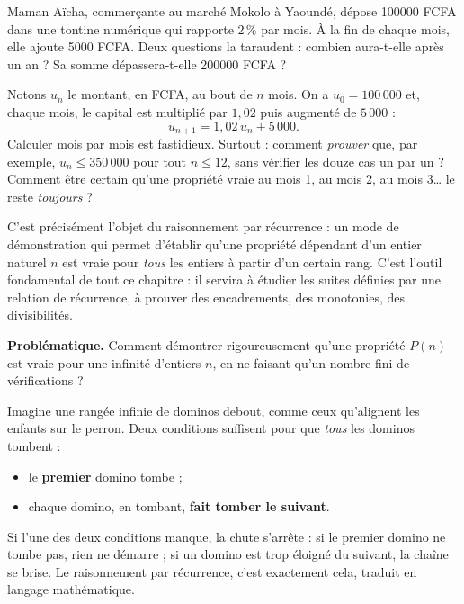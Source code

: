 \documentclass[11pt]{article}
\newcommand{\cle}[1]{{\popxbold\color{popdark}#1}}
\newcounter{popsec}
\newcounter{popsub}
\newcommand{\courssub}[1]{%
  \stepcounter{popsub}%
  \par\vspace{9pt}\noindent{\popxbold\fontsize{11.5}{13}\selectfont\color{popink}{\color{poporange}\thepopsec.\thepopsub}\hspace{6pt}#1}\par\nopagebreak\vspace{4pt}
}
\begin{document}
Maman Aïcha, commerçante au marché Mokolo à Yaoundé, dépose \SI{100000}{} FCFA dans une tontine numérique qui rapporte $2\,\%$ par mois. À la fin de chaque mois, elle ajoute \SI{5000}{} FCFA. Deux questions la taraudent : combien aura-t-elle après un an ? Sa somme dépassera-t-elle \SI{200000}{} FCFA ?

Notons $u_n$ le montant, en FCFA, au bout de $n$ mois. On a $u_0 = 100\,000$ et, chaque mois, le capital est multiplié par $1{,}02$ puis augmenté de $5\,000$ :
\[ u_{n+1} = 1{,}02\,u_n + 5\,000. \]
Calculer mois par mois est fastidieux. Surtout : comment \emph{prouver} que, par exemple, $u_n \leq 350\,000$ pour tout $n \leq 12$, sans vérifier les douze cas un par un ? Comment être certain qu'une propriété vraie au mois 1, au mois 2, au mois 3\ldots{} le reste \emph{toujours} ?

C'est précisément l'objet du \cle{raisonnement par récurrence} : un mode de démonstration qui permet d'établir qu'une propriété dépendant d'un entier naturel $n$ est vraie pour \emph{tous} les entiers à partir d'un certain rang. C'est l'outil fondamental de tout ce chapitre : il servira à étudier les suites définies par une relation de récurrence, à prouver des encadrements, des monotonies, des divisibilités.

\textbf{Problématique.} Comment démontrer rigoureusement qu'une propriété $P(n)$ est vraie pour une infinité d'entiers $n$, en ne faisant qu'un nombre fini de vérifications ?

\courssub{L'intuition : l'effet domino}

Imagine une rangée infinie de dominos debout, comme ceux qu'alignent les enfants sur le perron. Deux conditions suffisent pour que \emph{tous} les dominos tombent :

\begin{itemize}
\item le \textbf{premier} domino tombe ;
\item chaque domino, en tombant, \textbf{fait tomber le suivant}.
\end{itemize}

Si l'une des deux conditions manque, la chute s'arrête : si le premier domino ne tombe pas, rien ne démarre ; si un domino est trop éloigné du suivant, la chaîne se brise. Le raisonnement par récurrence, c'est exactement cela, traduit en langage mathématique.
\end{document}
